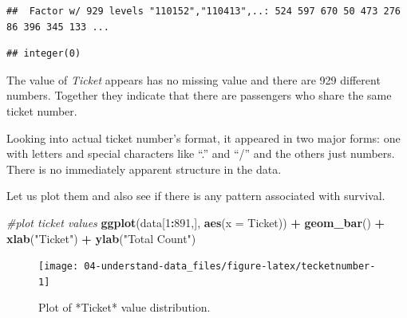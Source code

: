 \documentclass[
]{book}
\newenvironment{Shaded}{\begin{snugshade}}{\end{snugshade}}
\newcommand{\CommentTok}[1]{\textcolor[rgb]{0.56,0.35,0.01}{\textit{#1}}}
\newcommand{\DataTypeTok}[1]{\textcolor[rgb]{0.13,0.29,0.53}{#1}}
\newcommand{\DecValTok}[1]{\textcolor[rgb]{0.00,0.00,0.81}{#1}}
\newcommand{\KeywordTok}[1]{\textcolor[rgb]{0.13,0.29,0.53}{\textbf{#1}}}
\newcommand{\NormalTok}[1]{#1}
\newcommand{\OperatorTok}[1]{\textcolor[rgb]{0.81,0.36,0.00}{\textbf{#1}}}
\newcommand{\StringTok}[1]{\textcolor[rgb]{0.31,0.60,0.02}{#1}}
\begin{document}
\begin{Shaded}
\end{Shaded}

\begin{verbatim}
##  Factor w/ 929 levels "110152","110413",..: 524 597 670 50 473 276 86 396 345 133 ...
\end{verbatim}

\begin{Shaded}
\end{Shaded}

\begin{verbatim}
## integer(0)
\end{verbatim}

The value of \emph{Ticket} appears has no missing value and there are 929 different numbers. Together they indicate that there are passengers who share the same ticket number.

Looking into actual ticket number's format, it appeared in two major forms: one with letters and special characters like ``.'' and ``/'' and the others just numbers. There is no immediately apparent structure in the data.

Let us plot them and also see if there is any pattern associated with survival.

\begin{Shaded}
\begin{Highlighting}[]
\CommentTok{#plot ticket values }
\KeywordTok{ggplot}\NormalTok{(data[}\DecValTok{1}\OperatorTok{:}\DecValTok{891}\NormalTok{,], }\KeywordTok{aes}\NormalTok{(}\DataTypeTok{x =}\NormalTok{ Ticket)) }\OperatorTok{+}
\StringTok{  }\KeywordTok{geom_bar}\NormalTok{() }\OperatorTok{+}
\StringTok{  }\KeywordTok{xlab}\NormalTok{(}\StringTok{"Ticket"}\NormalTok{) }\OperatorTok{+}
\StringTok{  }\KeywordTok{ylab}\NormalTok{(}\StringTok{"Total Count"}\NormalTok{)}
\end{Highlighting}
\end{Shaded}

\begin{figure}

{\centering \texttt{[image: 04-understand-data\_files/figure-latex/tecketnumber-1]} 

}

\caption{Plot of *Ticket* value distribution.}\label{fig:tecketnumber}
\end{figure}
\end{document}

